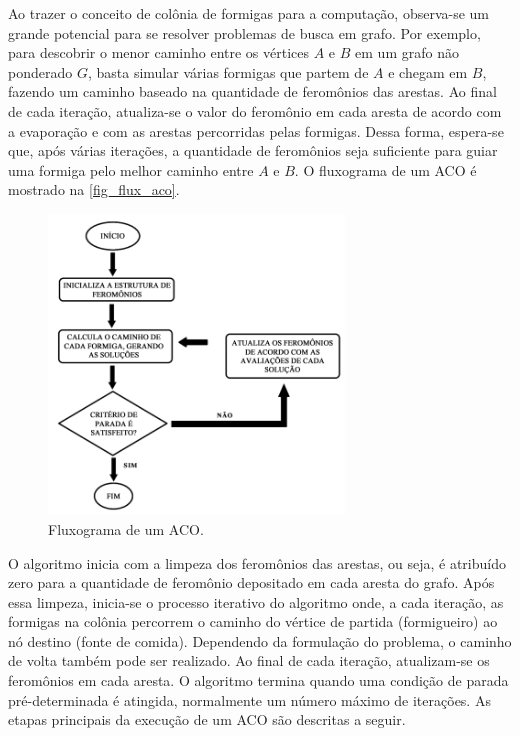 Ao trazer o conceito de colônia de formigas para a computação, observa-se um grande potencial para se resolver problemas de busca em grafo. Por exemplo, para descobrir o menor caminho entre os vértices $A$ e $B$ em um grafo não ponderado $G$, basta simular várias formigas que partem de $A$ e chegam em $B$, fazendo um caminho baseado na quantidade de feromônios das arestas. Ao final de cada iteração, atualiza-se o valor do feromônio em cada aresta de acordo com a evaporação e com as arestas percorridas pelas formigas. Dessa forma, espera-se que, após várias iterações, a quantidade de feromônios seja suficiente para guiar uma formiga pelo melhor caminho entre $A$ e $B$. O fluxograma de um ACO é mostrado na \autoref{fig_flux_aco}.

\begin{figure}[!htbp]
	\centering
	\includegraphics[width=0.7\textwidth]{cap_otimizacao-bio/figs/aco-flux.png}
	\caption{\label{fig_flux_aco}Fluxograma de um ACO.}
\end{figure}

O algoritmo inicia com a limpeza dos feromônios das arestas, ou seja, é atribuído zero para a quantidade de feromônio depositado em cada aresta do grafo. Após essa limpeza, inicia-se o processo iterativo do algoritmo onde, a cada iteração, as formigas na colônia percorrem o caminho do vértice de partida (formigueiro) ao nó destino (fonte de comida). Dependendo da formulação do problema, o caminho de volta também pode ser realizado. Ao final de cada iteração, atualizam-se os feromônios em cada aresta. O algoritmo termina quando uma condição de parada pré-determinada é atingida, normalmente um número máximo de iterações. As etapas principais da execução de um ACO são descritas a seguir.

